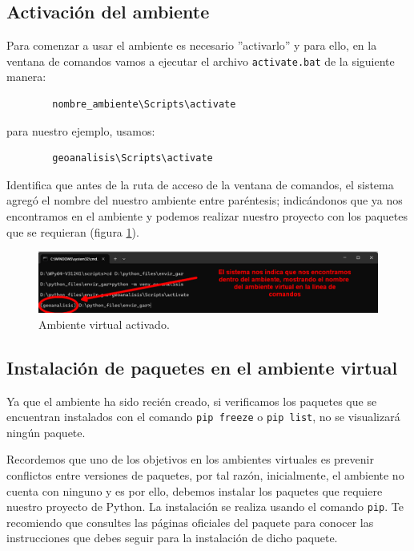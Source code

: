 \documentclass{article}
\begin{document}
	\subsection{Activación del ambiente}
	Para comenzar a usar el ambiente es necesario ''activarlo'' y para ello, en la ventana de comandos vamos a ejecutar el archivo \texttt{activate.bat} de la siguiente manera:
	\begin{verbatim}
		nombre_ambiente\Scripts\activate
	\end{verbatim}
	
	para nuestro ejemplo, usamos:
	\begin{verbatim}
		geoanalisis\Scripts\activate
	\end{verbatim}
	
	Identifica que antes de la ruta de acceso de la ventana de comandos, el sistema agregó el nombre del nuestro ambiente entre paréntesis; indicándonos que ya nos encontramos en el ambiente y podemos realizar nuestro proyecto con los paquetes que se requieran (figura \ref{fig:figura08}).
	
	\begin{figure}[H]
		\centering
		\includegraphics[width=0.9\linewidth]{Figura08}
		\caption{Ambiente virtual activado.}
		\label{fig:figura08}
	\end{figure}
	
	\subsection{Instalación de paquetes en el ambiente virtual}
	Ya que el ambiente ha sido recién creado, si verificamos los paquetes que se encuentran instalados con el comando \texttt{pip freeze} o \texttt{pip list}, no se visualizará ningún paquete.\bigskip
	
	Recordemos que uno de los objetivos en los ambientes virtuales es prevenir conflictos entre versiones de paquetes, por tal razón, inicialmente, el ambiente no cuenta con ninguno y es por ello, debemos instalar los paquetes que requiere nuestro proyecto de Python. La instalación se realiza usando el comando \texttt{pip}. Te recomiendo que consultes las páginas oficiales del paquete para conocer las instrucciones que debes seguir para la instalación de dicho paquete.\bigskip
	
\end{document}
